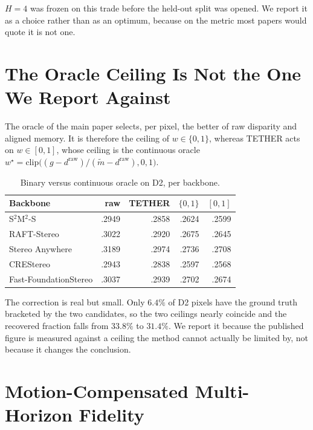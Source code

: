 \documentclass[letterpaper,10pt,conference]{ieeeconf}
\newcommand{\steer}{\textsc{TETHER}}
\newcommand{\raw}{\mathrm{raw}}
\begin{document}
$H=4$ was frozen on this trade before the held-out split was opened. We
report it as a choice rather than as an optimum, because on the metric
most papers would quote it is not one.

\section{The Oracle Ceiling Is Not the One We Report Against}

The oracle of the main paper selects, per pixel, the better of raw
disparity and aligned memory. It is therefore the ceiling of
$w\in\{0,1\}$, whereas \steer{} acts on $w\in[0,1]$, whose ceiling is
the continuous oracle
$w^{\star}=\mathrm{clip}\big((g-d^{\raw})/(\widetilde m-d^{\raw}),0,1\big)$.

\begin{table}[htb]
\centering
\small
\caption{Binary versus continuous oracle on D2, per backbone.}
\label{sup:oracle}
\begin{tabular}{lrrrr}
\toprule
Backbone & raw & \steer & $\{0,1\}$ & $[0,1]$ \\
\midrule
S$^2$M$^2$-S          & .2949 & .2858 & .2624 & .2599 \\
RAFT-Stereo           & .3022 & .2920 & .2675 & .2645 \\
Stereo Anywhere       & .3189 & .2974 & .2736 & .2708 \\
CREStereo             & .2943 & .2838 & .2597 & .2568 \\
Fast-FoundationStereo & .3037 & .2939 & .2702 & .2674 \\
\bottomrule
\end{tabular}
\end{table}

The correction is real but small. Only $6.4\%$ of D2 pixels have the
ground truth bracketed by the two candidates, so the two ceilings nearly
coincide and the recovered fraction falls from $33.8\%$ to $31.4\%$. We report it because the published figure is
measured against a ceiling the method cannot actually be limited by, not
because it changes the conclusion.

\section{Motion-Compensated Multi-Horizon Fidelity}
\label{sup:tepe}
\end{document}
